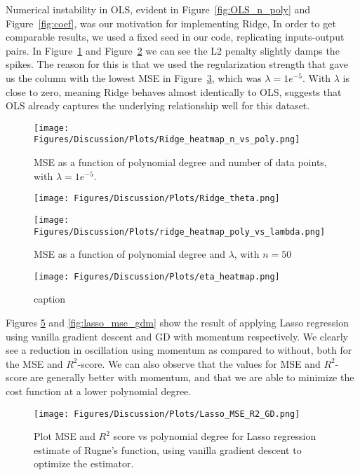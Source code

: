 \documentclass[amssymb,twocolumn,aps]{revtex4}
\begin{document}
Numerical instability in OLS, evident in Figure~\ref{fig:OLS_n_poly} and Figure~\ref{fig:coef}, was our motivation for implementing Ridge, In order to get comparable results, we used a fixed seed in our code, replicating inputs-output pairs. In Figure~\ref{fig:ridgehm} and Figure~\ref{fig:ridgetheta} we can see the L2 penalty  slightly damps the spikes. The reason for this is that we used the regularization strength that gave us the column with the lowest MSE in Figure~\ref{fig:pollam}, which was $\lambda=1e^{-5}$. With $\lambda$ is close to zero, meaning Ridge behaves almost identically to OLS, suggests that OLS already captures the underlying relationship well for this dataset.



\begin{figure}[h]
    \centering
    \texttt{[image: Figures/Discussion/Plots/Ridge\_heatmap\_n\_vs\_poly.png]}
    \caption{MSE as a function of polynomial degree and number of data points, with $\lambda = 1e^{-5}$.}
    \label{fig:ridgehm}
\end{figure}
\begin{figure}[h]
    \centering
    \texttt{[image: Figures/Discussion/Plots/Ridge\_theta.png]}
    \caption{}
    \label{fig:ridgetheta}
\end{figure}
\begin{figure}[h]
    \centering
    \texttt{[image: Figures/Discussion/Plots/ridge\_heatmap\_poly\_vs\_lambda.png]}
    \caption{MSE as a function of polynomial degree and $\lambda$, with $n=50$}
    \label{fig:pollam}
\end{figure}
\begin{figure}[h]
    \centering
    \texttt{[image: Figures/Discussion/Plots/eta\_heatmap.png]}
    \caption{caption}
    \label{fig:}
\end{figure}


Figures \ref{fig:lasso_mse_gd} and \ref{fig:lasso_mse_gdm} show the result of applying Lasso regression using vanilla gradient descent and GD with momentum respectively. We clearly see a reduction in oscillation using momentum as compared to without, both for the MSE and $R^2$-score. We can also observe that the values for MSE and $R^2$-score are generally better with momentum, and that we are able to minimize the cost function at a lower polynomial degree.

\begin{figure}[h]
    \centering
    \texttt{[image: Figures/Discussion/Plots/Lasso\_MSE\_R2\_GD.png]}
    \caption{Plot MSE and $R^2$ score vs polynomial degree for Lasso regression estimate of Rugne's function, using vanilla gradient descent to optimize the estimator.}
    \label{fig:lasso_mse_gd}
\end{figure}
\end{document}
